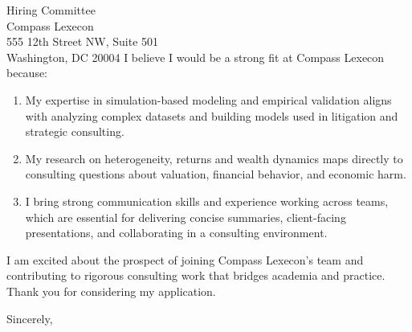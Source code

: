 \documentclass[11pt,letterpaper]{letter}
\begin{document}
\begin{letter}{Hiring Committee \\
Compass Lexecon \\
555 12th Street NW, Suite 501 \\
Washington, DC 20004}
I believe I would be a strong fit at Compass Lexecon because:
\begin{enumerate}
    \item My expertise in simulation-based modeling and empirical validation aligns with analyzing complex datasets and building models used in litigation and strategic consulting.
    \item My research on heterogeneity, returns and wealth dynamics maps directly to consulting questions about valuation, financial behavior, and economic harm.
    \item I bring strong communication skills and experience working across teams, which are essential for delivering concise summaries, client-facing presentations, and collaborating in a consulting environment.
\end{enumerate}

I am excited about the prospect of joining Compass Lexecon’s team and contributing to rigorous consulting work that bridges academia and practice. Thank you for considering my application.

\closing{Sincerely,}

\end{letter}
\end{document}
